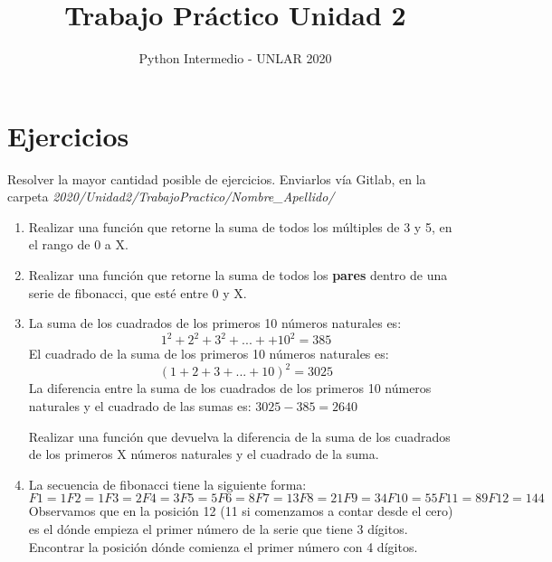 \documentclass[12pt, spanish]{article}
\title{Trabajo Práctico Unidad 2}
\author{Python Intermedio - UNLAR 2020}
\begin{document}
\maketitle

\section{Ejercicios}

Resolver la mayor cantidad posible de ejercicios. Enviarlos vía Gitlab, en la carpeta
\textit{2020/Unidad2/TrabajoPractico/Nombre\_Apellido/}

\begin{enumerate}
	\item Realizar una función que retorne la suma de todos los múltiples de 3 y 5, en el rango de 0 a X.
	\item Realizar una función que retorne la suma de todos los \textbf{pares} dentro de una serie de fibonacci, que esté entre 0 y X.
	\item La suma de los cuadrados de los primeros 10 números  naturales es:
	\begin{equation}\label{key}
		1^{2} + 2^{2} + 3^{2} + ... + + 10^{2} = 385
	\end{equation}
El cuadrado de la suma  de los primeros 10 números naturales es:
	\begin{equation}\label{key}
		(1 + 2 + 3 + ... + 10)^{2} = 3025
	\end{equation}
La diferencia entre la suma de los cuadrados de los primeros 10 números naturales y el cuadrado de las sumas es:
$ 3025 - 385 = 2640 $

Realizar una función que devuelva la diferencia de la suma de los cuadrados de los primeros X números naturales y el cuadrado de la suma. 

	\item La secuencia de fibonacci tiene la siguiente forma:
	$
	F1 = 1
	F2 = 1
	F3 = 2
	F4 = 3
	F5 = 5
	F6 = 8
	F7 = 13
	F8 = 21
	F9 = 34
	F10 = 55
	F11 = 89
	F12 = 144
	$
	Observamos que en la posición 12 (11 si comenzamos a contar desde el cero) es el dónde empieza el primer número de la serie que tiene 3 dígitos. Encontrar la posición dónde comienza el primer número con 4 dígitos.
	

\end{enumerate}
\end{document}
